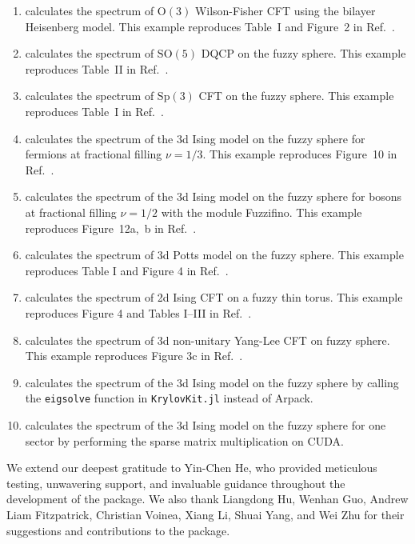 \documentclass{timesjhep}
\begin{document}
\begin{enumerate}
    \item {} calculates the spectrum of $\mathrm{O}(3)$ Wilson-Fisher CFT using the bilayer Heisenberg model. This example reproduces Table~I and Figure~2 in Ref.~\cite{Han2023Dec}.
    \item {} calculates the spectrum of $\mathrm{SO}(5)$ DQCP on the fuzzy sphere. This example reproduces Table~II in Ref.~\cite{Zhou2023}.
    \item {} calculates the spectrum of $\mathrm{Sp}(3)$ CFT on the fuzzy sphere. This example reproduces Table~I in Ref.~\cite{Zhou2024Oct}.
    \item {} calculates the spectrum of the 3d Ising model on the fuzzy sphere for fermions at fractional filling $\nu = 1/3$. This example reproduces Figure~10 in Ref.~\cite{Voinea2024}.
    \item {} calculates the spectrum of the 3d Ising model on the fuzzy sphere for bosons at fractional filling $\nu = 1/2$ with the module Fuzzifino. This example reproduces Figure~12a,~b in Ref.~\cite{Voinea2024}.
    \item {} calculates the spectrum of 3d Potts model on the fuzzy sphere. This example reproduces Table I and Figure 4 in Ref.~\cite{Yang2025}.
    \item {} calculates the spectrum of 2d Ising CFT on a fuzzy thin torus. This example reproduces Figure 4 and Tables I--III in Ref.~\cite{Han2025}.
    \item {} calculates the spectrum of 3d non-unitary Yang-Lee CFT on fuzzy sphere. This example reproduces Figure 3c in Ref.~\cite{Fan2025}.
    \item {} calculates the spectrum of the 3d Ising model on the fuzzy sphere by calling the \lstinline|eigsolve| function in \lstinline|KrylovKit.jl| instead of Arpack.
    \item {} calculates the spectrum of the 3d Ising model on the fuzzy sphere for one sector by performing the sparse matrix multiplication on CUDA.
\end{enumerate}

\clearpage
\acknowledgments

We extend our deepest gratitude to Yin-Chen He, who provided meticulous testing, unwavering support, and invaluable guidance throughout the development of the package. We also thank Liangdong Hu, Wenhan Guo, Andrew Liam Fitzpatrick, Christian Voinea, Xiang Li, Shuai Yang, and Wei Zhu for their suggestions and contributions to the package.
\end{document}
